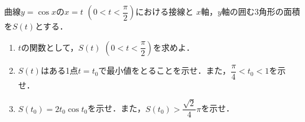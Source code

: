 \documentclass[../../main.tex]{subfiles}
\begin{document}
曲線$y=\cos x$の$x=t$ $\displaystyle\left(0<t<\dfrac{\pi}{2}\right)$における接線と
$x$軸，$y$軸の囲む3角形の面積を$S(t)$とする．
\begin{enumerate}
  \item $t$の関数として，$S(t)$ $\displaystyle\left(0<t<\dfrac{\pi}{2}\right)$を求めよ．
  \item $S(t)$はある1点$t=t_0$で最小値をとることを示せ．また，$\displaystyle\dfrac{\pi}{4}<t_0<1$を示せ．
  \item $S(t_0)=2t_0\cos t_0$を示せ．また，$\displaystyle S(t_0)>\dfrac{\sqrt2}{4}\pi$を示せ．
\end{enumerate}
\end{document}
